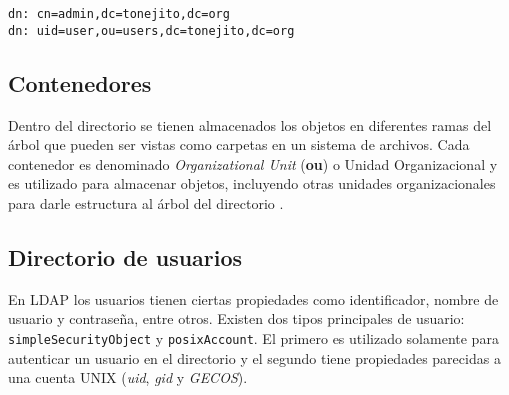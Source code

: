 {
\normalsize
\linespread{1}
\begin{center}
  \texttt{dn: cn=admin,dc=tonejito,dc=org}
  \\
  \texttt{dn: uid=user,ou=users,dc=tonejito,dc=org}
\end{center}
}

  \subsection{Contenedores}

Dentro del directorio se tienen almacenados los objetos en diferentes ramas del \'{a}rbol que pueden ser vistas como carpetas en un sistema de archivos. Cada contenedor es denominado \textit{Organizational Unit} (\textbf{ou}) o Unidad Organizacional y es utilizado para almacenar objetos, incluyendo otras unidades organizacionales para darle estructura al \'{a}rbol del directorio \cite{_appendix_????}.


  \subsection {Directorio de usuarios}

En \textsc{LDAP}  los usuarios tienen ciertas propiedades como identificador, nombre de usuario y contrase\~{n}a, entre otros. Existen dos tipos principales de usuario: \texttt{simpleSecurityObject} y \texttt{posixAccount}. El primero es utilizado solamente para autenticar un usuario en el directorio y el segundo tiene propiedades parecidas a una cuenta \textsc{UNIX} (\textit{uid}, \textit{gid} y \textit{GECOS}).


